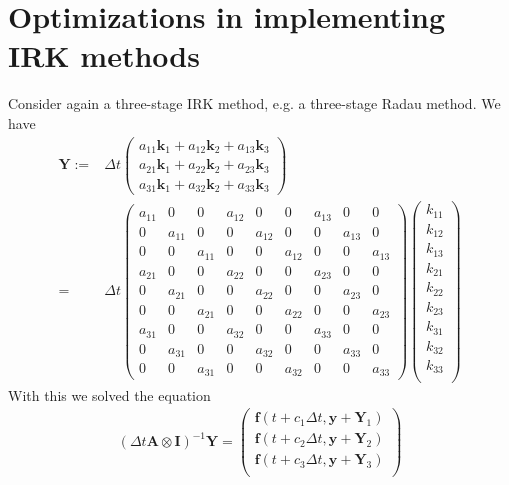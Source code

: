 \documentclass[10pt,a4paper]{article}
\newcommand{\bvec}[1]{\mathbf{#1}}
\begin{document}
\section{Optimizations in implementing IRK methods}
Consider again a three-stage IRK method, e.g. a three-stage Radau method.
We have
\begin{align*}
  \bvec{Y} :=& \Delta t
  \begin{pmatrix}
    a_{11}\bvec{k}_1 + a_{12}\bvec{k}_2 + a_{13}\bvec{k}_3 \\
    a_{21}\bvec{k}_1 + a_{22}\bvec{k}_2 + a_{23}\bvec{k}_3 \\
    a_{31}\bvec{k}_1 + a_{32}\bvec{k}_2 + a_{33}\bvec{k}_3
  \end{pmatrix} \\
  =& \Delta t \begin{pmatrix}
    a_{11} & 0 & 0 &  a_{12} & 0 & 0 & a_{13} & 0 & 0 \\
    0 & a_{11} & 0 & 0 &  a_{12} & 0 & 0 & a_{13} & 0 \\
    0 & 0 & a_{11} & 0 & 0 &  a_{12} & 0 & 0 & a_{13} \\
    a_{21} & 0 & 0 &  a_{22} & 0 & 0 & a_{23} & 0 & 0 \\
    0 & a_{21} & 0 & 0 &  a_{22} & 0 & 0 & a_{23} & 0 \\
    0 & 0 & a_{21} & 0 & 0 &  a_{22} & 0 & 0 & a_{23} \\
    a_{31} & 0 & 0 &  a_{32} & 0 & 0 & a_{33} & 0 & 0 \\
    0 & a_{31} & 0 & 0 &  a_{32} & 0 & 0 & a_{33} & 0 \\
    0 & 0 & a_{31} & 0 & 0 &  a_{32} & 0 & 0 & a_{33}
     \end{pmatrix}
     \begin{pmatrix}
       k_{11} \\
       k_{12} \\
       k_{13} \\
       k_{21} \\
       k_{22} \\
       k_{23} \\
       k_{31} \\
       k_{32} \\
       k_{33} \\
     \end{pmatrix}
\end{align*}
With this we solved the equation
\begin{align*}
  (\Delta t \bvec{A}\otimes \bvec{I})^{-1}\bvec{Y} = \begin{pmatrix}
  \bvec{f}(t + c_1\Delta t, \bvec{y} + \bvec{Y}_1) \\
  \bvec{f}(t + c_2\Delta t, \bvec{y} + \bvec{Y}_2) \\
  \bvec{f}(t + c_3\Delta t, \bvec{y} + \bvec{Y}_3) \\
  \end{pmatrix}
\end{align*}
\end{document}
